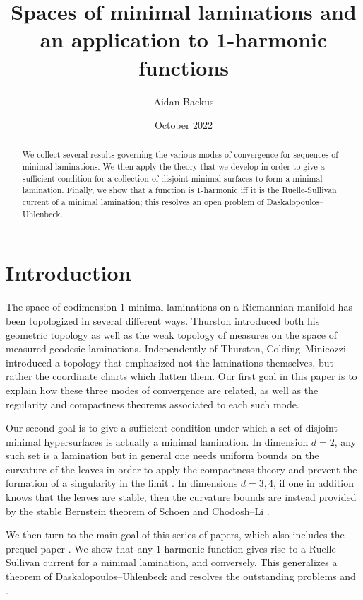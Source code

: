 \documentclass[reqno,11pt]{amsart}
\title{Spaces of minimal laminations and an application to 1-harmonic functions}
\author{Aidan Backus}
\date{October 2022}
\theoremstyle{definition}
\numberwithin{equation}{section}
\begin{document}
\begin{abstract}
We collect several results governing the various modes of convergence for sequences of minimal laminations.
We then apply the theory that we develop in order to give a sufficient condition for a collection of disjoint minimal surfaces to form a minimal lamination.
Finally, we show that a function is 1-harmonic iff it is the Ruelle-Sullivan current of a minimal lamination; this resolves an open problem of Daskalopoulos--Uhlenbeck.
\end{abstract}

\maketitle



\section{Introduction}
The space of codimension-$1$ minimal laminations on a Riemannian manifold has been topologized in several different ways.
Thurston \cite[Chapter 8]{thurston1979geometry} introduced both his geometric topology as well as the weak topology of measures on the space of measured geodesic laminations.
Independently of Thurston, Colding--Minicozzi \cite[Appendix B]{ColdingMinicozziIV} introduced a topology that emphasized not the laminations themselves, but rather the coordinate charts which flatten them.
Our first goal in this paper is to explain how these three modes of convergence are related, as well as the regularity and compactness theorems associated to each such mode.

Our second goal is to give a sufficient condition under which a set of disjoint minimal hypersurfaces is actually a minimal lamination.
In dimension $d = 2$, any such set is a lamination \cite[Proposition 7.3]{daskalopoulos2020transverse} but in general one needs uniform bounds on the curvature of the leaves in order to apply the compactness theory and prevent the formation of a singularity in the limit \cite[Lemma II.1.1]{ColdingMinicozziV}.
In dimensions $d = 3, 4$, if one in addition knows that the leaves are stable, then the curvature bounds are instead provided by the stable Bernstein theorem of Schoen \cite{Schoen2016} and Chodosh--Li \cite{Chodosh2021}.

We then turn to the main goal of this series of papers, which also includes the prequel paper \cite{BackusFLG}.
We show that any $1$-harmonic function gives rise to a Ruelle-Sullivan current for a minimal lamination, and conversely.
This generalizes a theorem of Daskalopoulos--Uhlenbeck \cite[Theorem 6.1]{daskalopoulos2020transverse} and resolves the outstanding problems \cite[Problem 9.4]{daskalopoulos2020transverse} and \cite[Conjecture 9.5]{daskalopoulos2020transverse}.
\end{document}
